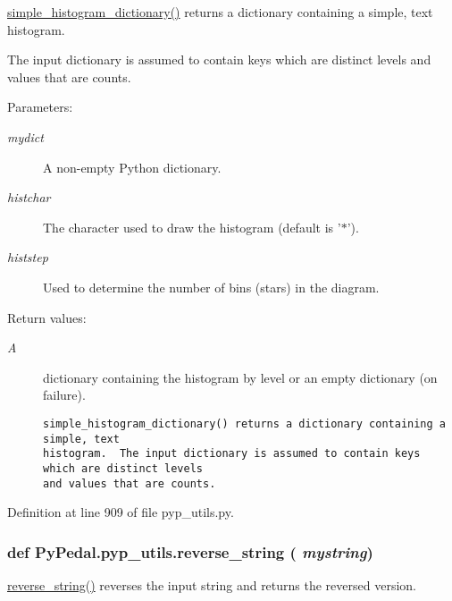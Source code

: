 \hyperlink{namespacePyPedal_1_1pyp__utils_05fa91a1849789836163518b5089150a}{simple\_\-histogram\_\-dictionary()} returns a dictionary containing a simple, text histogram. 

The input dictionary is assumed to contain keys which are distinct levels and values that are counts. \begin{Desc}
\item[Parameters:]
\begin{description}
\item[{\em mydict}]A non-empty Python dictionary. \item[{\em histchar}]The character used to draw the histogram (default is '$\ast$'). \item[{\em histstep}]Used to determine the number of bins (stars) in the diagram. \end{description}
\end{Desc}
\begin{Desc}
\item[Return values:]
\begin{description}
\item[{\em A}]dictionary containing the histogram by level or an empty dictionary (on failure).

\footnotesize\begin{verbatim}simple_histogram_dictionary() returns a dictionary containing a simple, text
histogram.  The input dictionary is assumed to contain keys which are distinct levels
and values that are counts.
\end{verbatim}
\normalsize
 \end{description}
\end{Desc}


Definition at line 909 of file pyp\_\-utils.py.\hypertarget{namespacePyPedal_1_1pyp__utils_60fec41ca3239178d96e99295fa5a9a4}{
\subsubsection[reverse\_\-string]{\setlength{\rightskip}{0pt plus 5cm}def Py\-Pedal.pyp\_\-utils.reverse\_\-string ( {\em mystring})}}
\label{namespacePyPedal_1_1pyp__utils_60fec41ca3239178d96e99295fa5a9a4}


\hyperlink{namespacePyPedal_1_1pyp__utils_60fec41ca3239178d96e99295fa5a9a4}{reverse\_\-string()} reverses the input string and returns the reversed version. 

